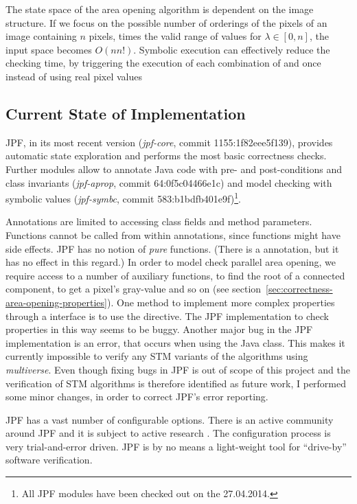 The state space of the area opening algorithm is dependent on the image
structure. If we focus on the possible number of orderings of the pixels of an
image containing $n$ pixels, times the valid range of values for $\lambda \in
[0, n]$, the input space becomes $O(nn!)$. Symbolic execution can effectively
reduce the checking time, by triggering the execution of each combination of
 and  once instead of using real
pixel values

\subsection{Current State of Implementation}
\label{sec:correctness-jpf-impl}

JPF, in its most recent version (\emph{jpf-core}, commit 1155:1f82eee5f139),
provides automatic state exploration and performs the most basic correctness
checks. Further modules allow to annotate Java code with pre- and
post-conditions and class invariants (\emph{jpf-aprop}, commit 64:0f5c04466e1c)
and model checking with symbolic values (\emph{jpf-symbc}, commit
583:b1bdfb401e9f)\footnote{All JPF modules have been checked out on the
  27.04.2014.}.

Annotations are limited to accessing class fields and method
parameters. Functions cannot be called from within annotations, since functions
might have side effects. JPF has no notion of \emph{pure} functions. (There is a
 annotation, but it has no effect in this regard.) In order
to model check parallel area opening, we require access to a number of auxiliary
functions, to find the root of a connected component, to get a pixel's
gray-value and so on (see
section~\ref{sec:correctness-area-opening-properties}). One method to implement
more complex properties through a  interface is to use the
 directive. The JPF implementation to check properties in
this way seems to be buggy. Another major bug in the JPF implementation is an
error, that occurs when using the Java  class. This makes it
currently impossible to verify any STM variants of the algorithms using
\emph{multiverse}. Even though fixing bugs in JPF is out of scope of this
project and the verification of STM algorithms is therefore identified as future
work, I performed some minor changes, in order to correct JPF's error reporting.

JPF has a vast number of configurable options. There is an active community
around JPF and it is subject to active research \cite{Visser2003Model,
  Khurshid2003Generalized, Visser2004Test}. The configuration process is very
trial-and-error driven. JPF is by no means a light-weight tool for ``drive-by''
software verification.

